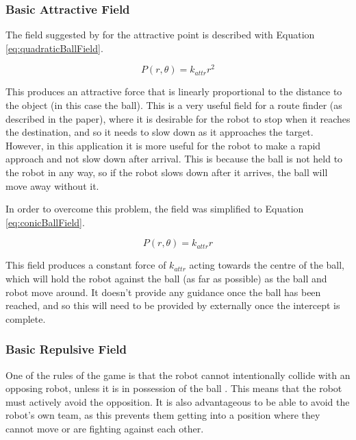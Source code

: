 \documentclass[10pt]{article}
\begin{document}
\subsubsection{Basic Attractive Field\label{sub:Basic-Attractive-Field}}

The field suggested by \cite{intelligentAlgorithmPathPlanning} for the
attractive point is described with Equation \ref{eq:quadraticBallField}.

\begin{equation}
P(r,\theta)=k_{attr}r^{2}\label{eq:quadraticBallField}
\end{equation}

This produces an attractive force that is linearly proportional to the distance
to the object (in this case the ball). This is a very useful field for a route
finder (as described in the paper), where it is desirable for the robot to stop
when it reaches the destination, and so it needs to slow down as it approaches
the target. However, in this application it is more useful for the robot to make
a rapid approach and not slow down after arrival. This is because the ball is
not held to the robot in any way, so if the robot slows down after it arrives,
the ball will move away without it.

In order to overcome this problem, the field was simplified to Equation
\ref{eq:conicBallField}.


\begin{equation}
P(r,\theta)=k_{attr}r\label{eq:conicBallField}
\end{equation}

This field produces a constant force of $k_{attr}$ acting towards the centre of
the ball, which will hold the robot against the ball (as far as possible) as the
ball and robot move around. It doesn't provide any guidance once the ball has
been reached, and so this will need to be provided by externally once
the intercept is complete.

\subsubsection{Basic Repulsive Field\label{sub:Basic-Repulsive-Field}}

One of the rules of the game is that the robot cannot intentionally collide with
an opposing robot, unless it is in possession of the ball \cite{simurosotSim}.
This means that the robot must actively avoid the opposition. It is also
advantageous to be able to avoid the robot's own team, as this prevents them
getting into a position where they cannot move or are fighting against each
other.
\end{document}
